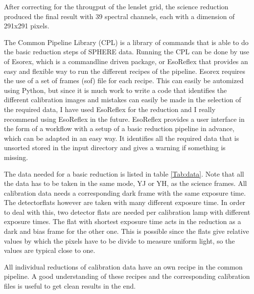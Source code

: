 \documentclass[twoside,single]{lion-msc}
\begin{document}
After correcting for the througput of the lenslet grid, the science reduction produced the final result with 39 spectral channels, each with a dimension of 291x291 pixels.
\bigskip

The Common Pipeline Library (CPL)\citep{Observatory2007} is a library of commands that is able to do the basic reduction steps of SPHERE data. Running the CPL can be done by use of Esorex, which is a commandline driven package, or EsoReflex that provides an easy and flexible way to run the different recipes of the pipeline. Esorex requires the use of a set of frames (sof) file for each recipe. This can easily be automized using Python, but since it is much work to write a code that identifies the different calibration images and mistakes can easily be made in the selection of the required data, I have used EsoReflex for the reduction and I really recommend using EsoReflex in the future. EsoReflex provides a user interface in the form of a workflow with a setup of a basic reduction pipeline in advance, which can be adapted in an easy way. It identifies all the required data that is unsorted stored in the input directory and gives a warning if something is missing. 
\bigskip

The data needed for a basic reduction is listed in table \ref{Tab:data}. Note that all the data has to be taken in the same mode, YJ or YH, as the science frames. All calibration data needs a corresponding dark frame with the same exposure time. The detectorflats however are taken with many different exposure time. In order to deal with this, two detector flats are needed per calibration lamp with different exposure times. The flat with shortest exposure time acts in the reduction as a dark and bias frame for the other one. This is possible since the flats give relative values by which the pixels have to be divide to measure uniform light, so the values are typical close to one. 
\bigskip

All individual reductions of calibration data have an own recipe in the common pipeline. A good understanding of these recipes and the corresponding calibration files is useful to get clean results in the end.
\end{document}
